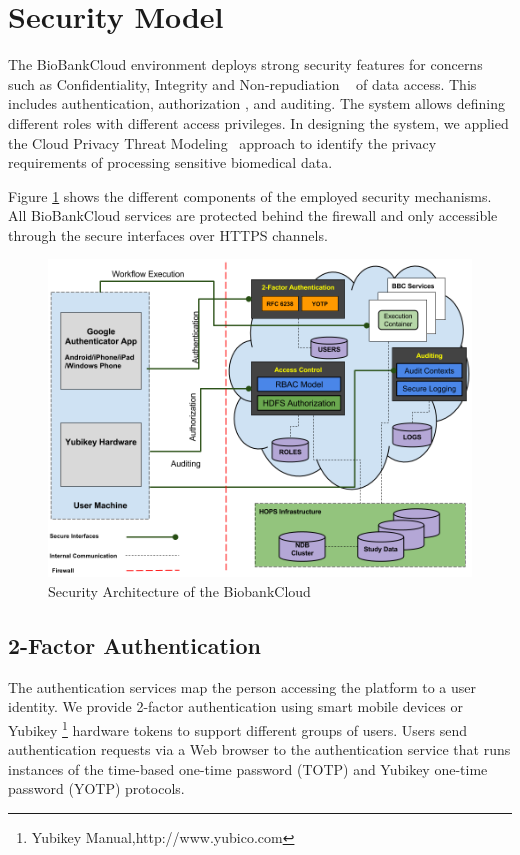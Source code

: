 \section{Security Model}

The BioBankCloud environment deploys strong security features for concerns such as Confidentiality, Integrity and Non-repudiation ~\cite{BBCSEC} of data access. This includes authentication, authorization
, and auditing. The system allows defining different roles with different access privileges. In designing the system, we applied the Cloud Privacy Threat Modeling~\cite {CPTM} approach to identify the privacy requirements of processing sensitive biomedical data.


Figure \ref{fig:security} shows the different components of the employed security mechanisms. All BioBankCloud services are protected behind the firewall and only accessible through the secure interfaces over HTTPS channels.


\begin{figure}[h]
\centering
\includegraphics[width=\textwidth]{./imgs/security.png}
\caption{Security Architecture of the BiobankCloud}
\label{fig:security}
\end{figure}


\subsection{2-Factor Authentication}
The authentication services map the person accessing the platform to a user identity. We provide 2-factor authentication using smart mobile devices or Yubikey \footnote {Yubikey Manual,http://www.yubico.com} hardware tokens to support different groups of users. Users send authentication requests via a Web browser to the authentication service that runs instances of the time-based one-time password (TOTP) and Yubikey one-time password (YOTP) protocols.

